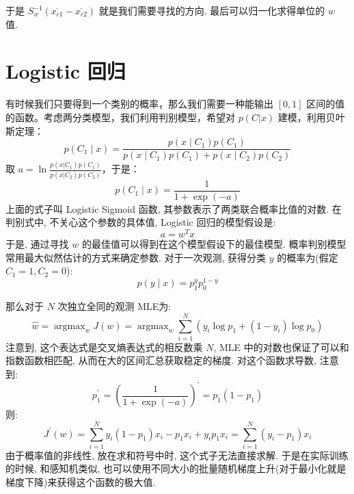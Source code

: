 于是 $S_w^{-1}(\overline{x_{c1}}-\overline{x_{c2}})$ 就是我们需要寻找的方向. 最后可以归一化求得单位的 $w$ 值.

\section{Logistic 回归}
有时候我们只要得到一个类别的概率，那么我们需要一种能输出 $[0,1]$ 区间的值的函数。考虑两分类模型，我们利用判别模型，希望对 $p(C|x)$ 建模，利用贝叶斯定理：
\begin{equation}
p\left(C_{1} \mid x\right)=\frac{p\left(x \mid C_{1}\right) p\left(C_{1}\right)}{p\left(x \mid C_{1}\right) p\left(C_{1}\right)+p\left(x \mid C_{2}\right) p\left(C_{2}\right)}
\end{equation}
取 $a=\ln\frac{p(x|C_1)p(C_1)}{p(x|C_2)p(C_2)}$，于是：
\begin{equation}
p\left(C_{1} \mid x\right)=\frac{1}{1+\exp (-a)}
​\end{equation}	
上面的式子叫 Logistic Sigmoid 函数, 其参数表示了两类联合概率比值的对数. 在判别式中, 不关心这个参数的具体值, Logistic 回归的模型假设是:
\begin{equation}
a=w^{T} x
​\end{equation}
于是, 通过寻找 $w$ 的最佳值可以得到在这个模型假设下的最佳模型. 概率判别模型常用最大似然估计的方式来确定参数.  对于一次观测, 获得分类 $y$ 的概率为(假定$C_1=1,C_2=0$): 
\begin{equation}
p(y \mid x)=p_{1}^{y} p_{0}^{1-y}
​\end{equation}

那么对于 $N$ 次独立全同的观测 MLE为:
\begin{equation}
\hat{w}=\operatorname{argmax}_{w} J(w)=\operatorname{argmax}_{w} \sum_{i=1}^{N}\left(y_{i} \log p_{1}+\left(1-y_{i}\right) \log p_{0}\right)
​\end{equation}
注意到, 这个表达式是交叉熵表达式的相反数乘 $N$, MLE 中的对数也保证了可以和指数函数相匹配, 从而在大的区间汇总获取稳定的梯度. 对这个函数求导数, 注意到: 
\begin{equation}
p_{1}^{\prime}=\left(\frac{1}{1+\exp (-a)}\right)^{\prime}=p_{1}\left(1-p_{1}\right)
​\end{equation}
则:
\begin{equation}
J^{\prime}(w)=\sum_{i=1}^{N} y_{i}\left(1-p_{1}\right) x_{i}-p_{1} x_{i}+y_{i} p_{1} x_{i}=\sum_{i=1}^{N}\left(y_{i}-p_{1}\right) x_{i}
​\end{equation}
由于概率值的非线性, 放在求和符号中时, 这个式子无法直接求解. 于是在实际训练的时候, 和感知机类似, 也可以使用不同大小的批量随机梯度上升(对于最小化就是梯度下降)来获得这个函数的极大值. 
